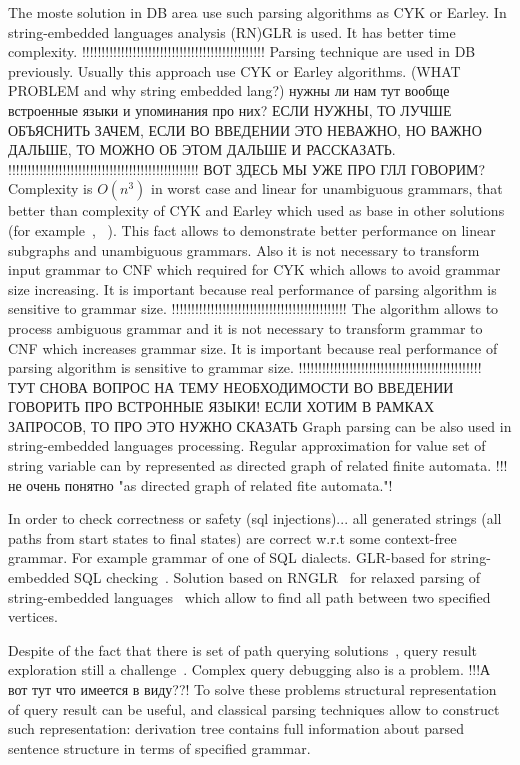 \documentclass{sig-alternate} %
\begin{document}
The moste solution in DB area use such parsing algorithms as CYK or Earley.
In string-embedded languages analysis (RN)GLR is used.
It has better time complexity.
!!!!!!!!!!!!!!!!!!!!!!!!!!!!!!!!!!!!!!!!!!!!!!!
Parsing technique are used in DB previously. Usually this approach use CYK or Earley algorithms. (WHAT PROBLEM and why string embedded lang?) нужны ли нам тут вообще встроенные языки и упоминания про них? ЕСЛИ НУЖНЫ, ТО ЛУЧШЕ ОБЪЯСНИТЬ ЗАЧЕМ, ЕСЛИ ВО ВВЕДЕНИИ ЭТО НЕВАЖНО, НО ВАЖНО ДАЛЬШЕ, ТО МОЖНО ОБ ЭТОМ ДАЛЬШЕ И РАССКАЗАТЬ.
!!!!!!!!!!!!!!!!!!!!!!!!!!!!!!!!!!!!!!!!!!!!!!!!!
ВОТ ЗДЕСЬ МЫ УЖЕ ПРО ГЛЛ ГОВОРИМ?
Complexity is $O(n^3)$ in worst case and linear for unambiguous grammars, that better than complexity of CYK and Earley which used as base in other solutions (for example~\cite{ConjCFPathQuery}, ~\cite{GraphQueryWithEarley}).
This fact allows to demonstrate better performance on linear subgraphs and unambiguous grammars.
Also it is not necessary to transform input grammar to CNF which required for CYK which allows to avoid grammar size increasing.
It is important because real performance of parsing algorithm is sensitive to grammar size.
!!!!!!!!!!!!!!!!!!!!!!!!!!!!!!!!!!!!!!!!!!!!!
The algorithm allows to process ambiguous grammar and it is not necessary to transform grammar to CNF which increases grammar size. It is important because real performance of parsing algorithm is sensitive to grammar size.
!!!!!!!!!!!!!!!!!!!!!!!!!!!!!!!!!!!!!!!!!!!!!!!
ТУТ СНОВА ВОПРОС НА ТЕМУ НЕОБХОДИМОСТИ ВО ВВЕДЕНИИ ГОВОРИТЬ ПРО ВСТРОННЫЕ ЯЗЫКИ! ЕСЛИ ХОТИМ В РАМКАХ ЗАПРОСОВ, ТО ПРО ЭТО НУЖНО СКАЗАТЬ
Graph parsing can be also used in string-embedded languages processing. 
Regular approximation for value set of string variable can by represented as directed graph of related finite automata. !!!не очень понятно "as directed graph of related fite automata."!

In order to check correctness or safety (sql injections)... all generated strings (all paths from start states to final states) are correct w.r.t some context-free grammar.
For example grammar of one of SQL dialects.
GLR-based for string-embedded SQL checking~\cite{Alvor1, Alvor2}.
Solution based on RNGLR~\cite{rnglr} for relaxed parsing of string-embedded languages~\cite{relaxedRNGLR} which allow to find all path between two specified vertices.

Despite of the fact that there is set of path querying solutions~\cite{GraphQueryWithEarley, ConjCFPathQuery, !!!}, query result exploration still a challenge~\cite{hofman2015separabilityForRegQueryDebugging}. 
Complex query debugging also is a problem. !!!А вот тут что имеется в виду??!
To solve these problems structural representation of query result can be useful, and classical parsing techniques allow to construct such representation: derivation tree contains full information about parsed sentence structure in terms of specified grammar.
\end{document}
